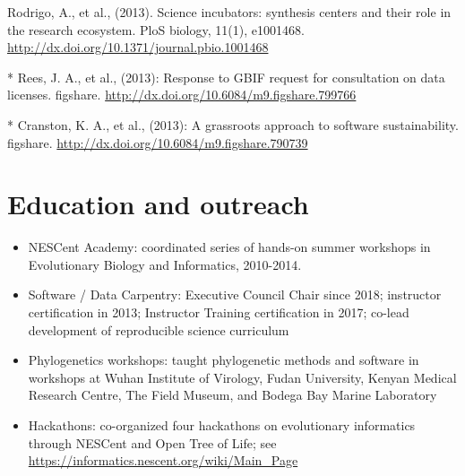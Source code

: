 \documentclass[10pt]{article}
\begin{document}
Rodrigo, A., et al., (2013). Science incubators: synthesis centers and their role in the research ecosystem. PloS biology, 11(1), e1001468. \url{http://dx.doi.org/10.1371/journal.pbio.1001468} 

* Rees, J. A., et al., (2013): Response to GBIF request for consultation on data licenses. figshare. \url{http://dx.doi.org/10.6084/m9.figshare.799766}

* Cranston, K. A., et al., (2013): A grassroots approach to software sustainability. figshare.
\url{http://dx.doi.org/10.6084/m9.figshare.790739}

\section*{Education and outreach}

\begin{itemize}
\item{NESCent Academy: coordinated series of hands-on summer workshops in Evolutionary Biology and Informatics, 2010-2014.}
\item{Software / Data Carpentry: Executive Council Chair since 2018; instructor certification in 2013; Instructor Training certification in 2017; co-lead development of reproducible science curriculum}
\item{Phylogenetics workshops: taught phylogenetic methods and software in workshops at Wuhan Institute of Virology, Fudan University, Kenyan Medical Research Centre, The Field Museum, and Bodega Bay Marine Laboratory} 
\item{Hackathons: co-organized four hackathons on evolutionary informatics through NESCent and Open Tree of Life; see \url{https://informatics.nescent.org/wiki/Main_Page}}
\end{itemize}

\end{document}
